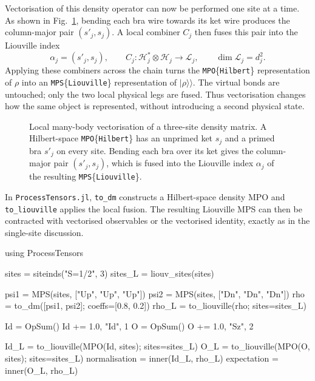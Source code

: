 Vectorisation of this density operator can now be performed one site at a time.
As shown in Fig.~\ref{fig:mpo-to-liouville-mps}, bending each bra wire towards its ket wire produces the column-major pair \((s'_j,s_j)\).
A local combiner \(C_j\) then fuses this pair into the Liouville index
%
\begin{equation}
    \alpha_j=(s'_j,s_j), \qquad
    C_j: \mathcal H_j^*\otimes\mathcal H_j \longrightarrow \mathcal L_j, \qquad \dim\mathcal L_j=d_j^2.
    \label{eq:local-liouville-combiner}
\end{equation}
%
Applying these combiners across the chain turns the \texttt{MPO}\{\texttt{Hilbert}\} representation of \(\rho\) into an \texttt{MPS}\{\texttt{Liouville}\} representation of \(\lvert\rho\rangle\!\rangle\).
The virtual bonds are untouched; only the two local physical legs are fused.
Thus vectorisation changes how the same object is represented, without introducing a second physical state.
%
\begin{figure}[H]
    \centering
    
    \caption{Local many-body vectorisation of a three-site density matrix.
    A Hilbert-space \texttt{MPO}\{\texttt{Hilbert}\} has an unprimed ket \(s_j\) and a primed bra \(s'_j\) on every site.
    Bending each bra over its ket gives the column-major pair \((s'_j,s_j)\), which is fused into the Liouville index \(\alpha_j\) of the resulting \texttt{MPS}\{\texttt{Liouville}\}.}
    \label{fig:mpo-to-liouville-mps}
\end{figure}
%
In \texttt{ProcessTensors.jl}, \texttt{to\_dm} constructs a Hilbert-space density MPO and \texttt{to\_liouville} applies the local fusion.
The resulting Liouville MPS can then be contracted with vectorised observables or the vectorised identity, exactly as in the single-site discussion.

%
\begin{juliacode}[
  caption={Three-site mixed state matching Fig.~\ref{fig:mpo-to-liouville-mps}.},
  label={lst:hilbert-to-liouville},
]
using ProcessTensors

sites = siteinds("S=1/2", 3)
sites_L = liouv_sites(sites)

psi1 = MPS(sites, ["Up", "Up", "Up"])
psi2 = MPS(sites, ["Dn", "Dn", "Dn"])
rho = to_dm([psi1, psi2]; coeffs=[0.8, 0.2])
rho_L = to_liouville(rho; sites=sites_L)

Id = OpSum()
Id += 1.0, "Id", 1
O = OpSum()
O += 1.0, "Sz", 2

Id_L = to_liouville(MPO(Id, sites); sites=sites_L)
O_L = to_liouville(MPO(O, sites); sites=sites_L)
normalisation = inner(Id_L, rho_L)
expectation = inner(O_L, rho_L)
\end{juliacode}
%

